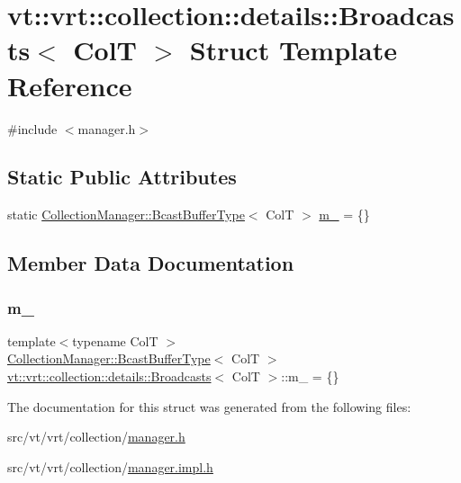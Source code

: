 \hypertarget{structvt_1_1vrt_1_1collection_1_1details_1_1_broadcasts}{}\section{vt\+:\+:vrt\+:\+:collection\+:\+:details\+:\+:Broadcasts$<$ ColT $>$ Struct Template Reference}
\label{structvt_1_1vrt_1_1collection_1_1details_1_1_broadcasts}


{\ttfamily \#include $<$manager.\+h$>$}

\subsection*{Static Public Attributes}
\begin{DoxyCompactItemize}
\item 
static \hyperlink{structvt_1_1vrt_1_1collection_1_1_collection_manager_af3a8c8a3c37301a98aa62f265858a3c0}{Collection\+Manager\+::\+Bcast\+Buffer\+Type}$<$ ColT $>$ \hyperlink{structvt_1_1vrt_1_1collection_1_1details_1_1_broadcasts_a1aa33e2390c414c51c4cf00920d8be5f}{m\+\_\+} = \{\}
\end{DoxyCompactItemize}


\subsection{Member Data Documentation}
\mbox{\label{structvt_1_1vrt_1_1collection_1_1details_1_1_broadcasts_a1aa33e2390c414c51c4cf00920d8be5f}} 
\subsubsection{\texorpdfstring{m\+\_\+}{m\_}}
{\footnotesize\ttfamily template$<$typename ColT $>$ \\
\hyperlink{structvt_1_1vrt_1_1collection_1_1_collection_manager_af3a8c8a3c37301a98aa62f265858a3c0}{Collection\+Manager\+::\+Bcast\+Buffer\+Type}$<$ ColT $>$ \hyperlink{structvt_1_1vrt_1_1collection_1_1details_1_1_broadcasts}{vt\+::vrt\+::collection\+::details\+::\+Broadcasts}$<$ ColT $>$\+::m\+\_\+ = \{\}\hspace{0.3cm}{\ttfamily [static]}}



The documentation for this struct was generated from the following files\+:\begin{DoxyCompactItemize}
\item 
src/vt/vrt/collection/\hyperlink{vrt_2collection_2manager_8h}{manager.\+h}\item 
src/vt/vrt/collection/\hyperlink{vrt_2collection_2manager_8impl_8h}{manager.\+impl.\+h}\end{DoxyCompactItemize}
